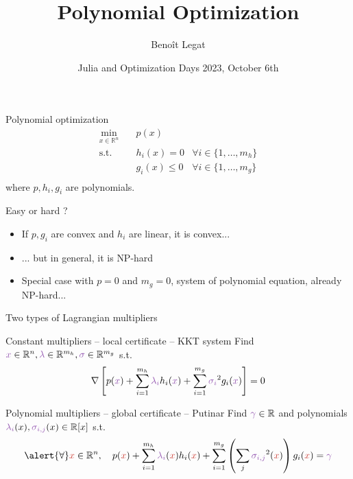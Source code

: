 \documentclass{beamer}
\title{Polynomial Optimization}
\date{Julia and Optimization Days 2023, October 6th}
\author{Beno\^it Legat}
\institute{
  \begin{minipage}{\textwidth}
    ERC ``Back to the Roots'' with Prof. Bart De Moor, STADIUS, KU Leuven

    
  \end{minipage}
}
\newcommand{\symvar}[1]{\textcolor{julia_red}{#1}}
\newcommand{\decisionvar}[1]{\textcolor{julia_purple}{#1}}
\begin{document}
  \maketitle

\begin{frame}{Polynomial optimization}
  \vspace{-1em}
  \begin{align*}
    \min_{x \in \mathbb{R}^n} \quad & p(x)\\
    \text{s.t.} \quad & h_i(x) = 0 & \forall i \in \{1, \ldots, m_h\}\\
                \quad & g_i(x) \le 0 & \forall i \in \{1, \ldots, m_g\}\\
  \end{align*}
  where $p, h_i, g_i$ are \alert{polynomials}.
  
  \begin{block}{Easy or hard ?}
    \begin{itemize}
      \item If $p, g_i$ are convex and $h_i$ are linear, it is convex...
      \item ... but in general, it is \alert{NP-hard}
      \item Special case with $p = 0$ and $m_g = 0$,
        system of polynomial equation, already \alert{NP-hard}...
    \end{itemize}
  \end{block}
\end{frame}

\begin{frame}{Two types of Lagrangian multipliers}
  \begin{block}{\alert{Constant} multipliers -- \alert{local} certificate -- KKT system}
    Find $\decisionvar{x} \in \R^n, \decisionvar{\lambda} \in \R^{m_h}, \decisionvar{\sigma} \in \R^{m_g}$ s.t.
    \[
      \nabla \left[ p(\decisionvar{x}) + \sum_{i=1}^{m_h} \decisionvar{\lambda_i} h_i(\decisionvar{x}) + \sum_{i=1}^{m_g} \decisionvar{\sigma_i}^2 g_i(\decisionvar{x}) \right] = 0
    \]
  \end{block}
  \begin{block}{\alert{Polynomial} multipliers -- \alert{global} certificate -- Putinar}
    Find $\decisionvar{\gamma} \in \R$ and polynomials $\decisionvar{\lambda_i}(x), \decisionvar{\sigma_{i, j}}(x) \in \R[x]$ s.t.
    \[
      \alert{\forall} \symvar{x} \in \R^n, \quad p(\symvar{x}) + \sum_{i=1}^{m_h} \decisionvar{\lambda_i}(\symvar{x}) h_i(\symvar{x}) + \sum_{i=1}^{m_g} \left(\sum_j \decisionvar{\sigma_{i,j}}^2(\symvar{x})\right) g_i(\symvar{x}) = \decisionvar{\gamma}
    \]
  \end{block}
\end{frame}
\end{document}
